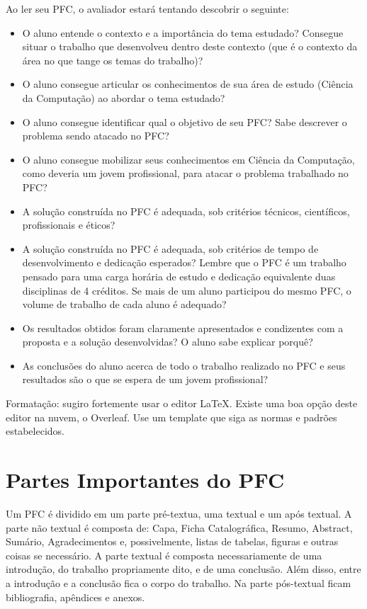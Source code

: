 Ao ler seu PFC, o avaliador estará tentando descobrir o seguinte:
\begin{itemize}
\item O aluno entende o contexto e a importância do tema estudado? Consegue situar o trabalho que desenvolveu dentro deste contexto (que é o contexto da área no que tange os temas do trabalho)?

\item O aluno consegue articular os conhecimentos de sua área de estudo (Ciência da Computação) ao abordar o tema estudado?

\item O aluno consegue identificar qual o objetivo de seu PFC? Sabe descrever o problema sendo atacado no PFC?

\item O aluno consegue mobilizar seus conhecimentos em Ciência da Computação, como deveria um jovem profissional, para atacar o problema trabalhado no PFC?

\item A solução construída no PFC é adequada, sob critérios técnicos, científicos, profissionais e éticos?

\item A solução construída no PFC é adequada, sob critérios de tempo de desenvolvimento e dedicação esperados? Lembre que o PFC é um trabalho pensado para uma carga horária de estudo e dedicação equivalente duas disciplinas de 4 créditos. Se mais de um aluno participou do mesmo PFC, o volume de trabalho de cada aluno é adequado?

\item Os resultados obtidos foram claramente apresentados e condizentes com a proposta e a solução desenvolvidas? O aluno sabe explicar porquê?

\item As conclusões do aluno acerca de todo o trabalho realizado no PFC e seus resultados são o que se espera de um jovem profissional?
\end{itemize}

Formatação: sugiro fortemente usar o editor LaTeX. Existe uma boa opção deste editor na nuvem, o Overleaf. Use um template que siga as normas e padrões estabelecidos.

\section{Partes Importantes do PFC}

Um PFC é dividido em um parte pré-textua, uma textual e um após textual. A parte não textual é composta de: Capa, Ficha Catalográfica, Resumo, Abstract, Sumário, Agradecimentos e, possivelmente, listas de tabelas, figuras e outras coisas se necessário. A parte textual é composta necessariamente de uma introdução, do trabalho propriamente dito, e de uma conclusão. Além disso, entre a introdução e a conclusão fica o corpo do trabalho. Na parte pós-textual ficam bibliografia, apêndices e anexos.

